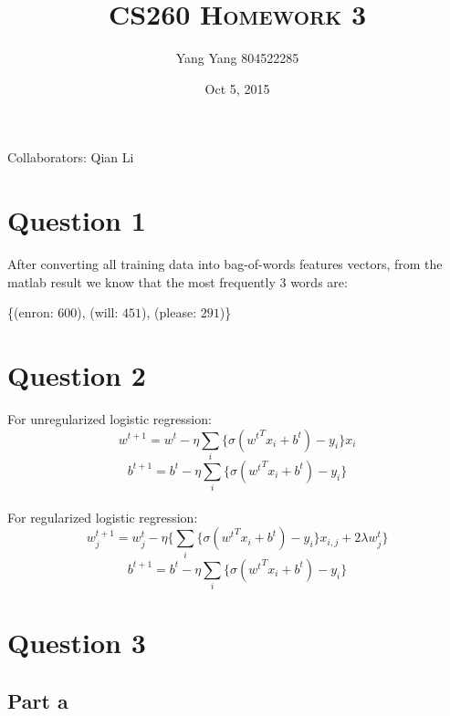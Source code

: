 \documentclass[11pt]{article}
\title{\textsc{CS260 Homework 3}}
\author{Yang Yang 804522285}
\date{Oct 5, 2015}
\numberwithin{equation}{section}
\begin{document}
       \maketitle
	
Collaborators:  Qian Li
\section{Question 1}
	After converting all training data into bag-of-words features vectors, from the matlab result we know that the most frequently 3 words are:
	\begin{center}
	\{(enron: $600$), (will: $451$), (please: $291$)\}
	\end{center}
\section{Question 2}
	For unregularized logistic regression:
	\begin{equation}
		w^{t+1} = w^t - \eta \sum_i \{\sigma({w^t}^Tx_i + b^t) - y_i\}x_i
	\end{equation}
	\begin{equation}
		b^{t+1} = b^t - \eta \sum_i \{\sigma({w^t}^Tx_i + b^t) - y_i\}
	\end{equation}
		\\[2ex]
	For regularized logistic regression:
	\begin{equation}
		w_j^{t+1} = w_j^t - \eta\{ \sum_i \{\sigma({w^t}^Tx_i + b^t) - y_i\}x_{i,j} + 2\lambda w_j^t\}
	\end{equation}
	\begin{equation}
		b^{t+1} = b^t - \eta \sum_i \{\sigma({w^t}^Tx_i + b^t) - y_i\}
	\end{equation}

\section{Question 3}
	\subsection{Part a}
	
\end{document}
